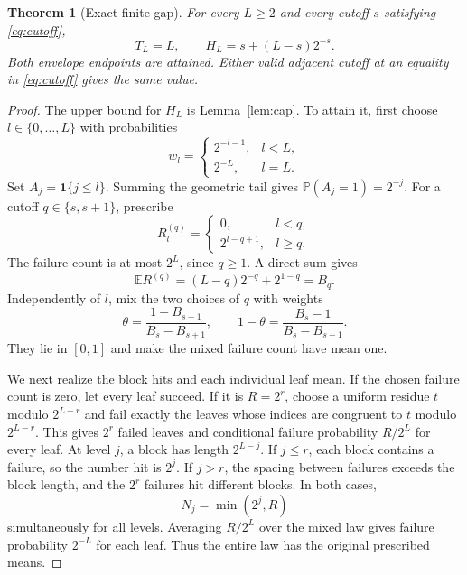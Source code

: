 \documentclass[11pt]{article}
\newtheorem{theorem}{Theorem}
\theoremstyle{remark}
\newcommand{\E}{\mathbb E}
\newcommand{\Prb}{\mathbb P}
\newcommand{\ind}{\mathbf 1}
\begin{document}
\begin{theorem}[Exact finite gap]\label{thm:exact}
For every $L\ge2$ and every cutoff $s$ satisfying \eqref{eq:cutoff},
\begin{equation}\label{eq:exact}
 T_L=L,\qquad H_L=s+(L-s)2^{-s}.
\end{equation}
Both envelope endpoints are attained. Either valid adjacent cutoff at
an equality in \eqref{eq:cutoff} gives the same value.
\end{theorem}
\begin{proof}
The upper bound for $H_L$ is Lemma~\ref{lem:cap}. To attain it, first
choose $l\in\{0,\ldots,L\}$ with probabilities
\begin{equation}\label{eq:threshold-weights}
 w_l=\begin{cases}2^{-l-1},&l<L,\\2^{-L},&l=L.\end{cases}
\end{equation}
Set $A_j=\ind\{j\le l\}$. Summing the geometric tail gives
$\Prb(A_j=1)=2^{-j}$. For a cutoff $q\in\{s,s+1\}$, prescribe
\begin{equation}\label{eq:failure-cutoff}
 R_l^{(q)}=\begin{cases}0,&l<q,\\2^{l-q+1},&l\ge q.\end{cases}
\end{equation}
The failure count is at most $2^L$, since $q\ge1$. A direct sum gives
\[
 \E R^{(q)}=(L-q)2^{-q}+2^{1-q}=B_q.
\]
Independently of $l$, mix the two choices of $q$ with weights
\begin{equation}\label{eq:cutoff-mix}
 \theta=\frac{1-B_{s+1}}{B_s-B_{s+1}},\qquad
 1-\theta=\frac{B_s-1}{B_s-B_{s+1}}.
\end{equation}
They lie in $[0,1]$ and make the mixed failure count have mean one.

We next realize the block hits and each individual leaf mean. If the
chosen failure count is zero, let every leaf succeed. If it is
$R=2^r$, choose a uniform residue $t$ modulo $2^{L-r}$ and fail exactly
the leaves whose indices are congruent to $t$ modulo $2^{L-r}$.
This gives $2^r$ failed leaves and conditional failure probability
$R/2^L$ for every leaf. At level $j$, a block has length $2^{L-j}$.
If $j\le r$, each block contains a failure, so the number hit is $2^j$.
If $j>r$, the spacing between failures exceeds the block length, and
the $2^r$ failures hit different blocks. In both cases,
\begin{equation}\label{eq:all-hits}
 N_j=\min(2^j,R)
\end{equation}
simultaneously for all levels. Averaging $R/2^L$ over the mixed law
gives failure probability $2^{-L}$ for each leaf. Thus the entire law
has the original prescribed means.


\end{proof}
\end{document}
